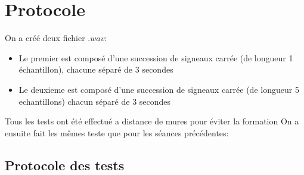 \documentclass[12pt,a4paper]{report}
\begin{document}
\section{Protocole}
	On a créé deux fichier $.wav$:
	\begin{itemize}
	\item Le premier est composé d'une succession de signeaux carrée (de longueur 1 échantillon), chacune séparé de 3 secondes
	\item Le deuxieme est composé d'une succession de signeaux carrée (de longueur 5 echantillons) chacun séparé de 3 secondes
	\end{itemize}
	Tous les tests ont été effectué a distance de mures pour éviter la formation 
	On a ensuite fait les mêmes teste que pour les séances précédentes:

\subsection{Protocole des tests}
\end{document}
